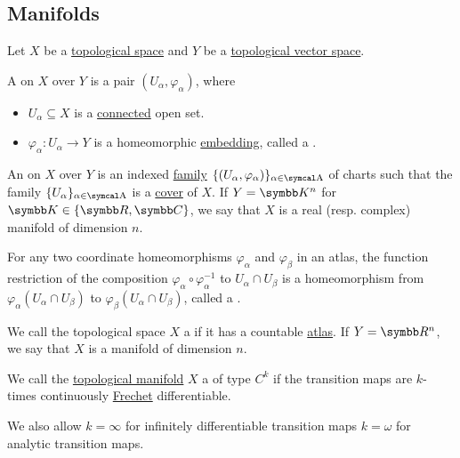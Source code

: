 \subsection{Manifolds}\label{subsec:manifolds}

\begin{definition}\label{def:atlas}\cite[definition 12.1]{Иванов2017}
  Let \( X \) be a \hyperref[def:topological_space]{topological space} and \( Y \) be a \hyperref[def:topological_vector_space]{topological vector space}.

  A  on \( X \) over \( Y \) is a pair \( (U_\alpha, \varphi_\alpha) \), where
  \begin{itemize}
    \item \( U_\alpha \subseteq X \) is a \hyperref[def:connected_space]{connected} open set.
    \item \( \varphi_\alpha: U_\alpha \to Y \) is a homeomorphic \hyperref[def:homeomorphism]{embedding}, called a .
  \end{itemize}

  An  on \( X \) over \( Y \) is an indexed \hyperref[def:indexed_family]{family} \( \{ (U_\alpha, \varphi_\alpha) \}_{\alpha \in \CA} \) of charts such that the family \( \{ U_\alpha \}_{\alpha \in \CA} \) is a \hyperref[def:set_partition]{cover} of \( X \). If \( Y = \BK^n \) for \( \BK \in \{ \BR, \BC \} \), we say that \( X \) is a real (resp. complex) manifold of dimension \( n \).

  For any two coordinate homeomorphisms \( \varphi_\alpha \) and \( \varphi_\beta \) in an atlas, the function restriction of the composition \( \varphi_\alpha \circ \varphi_\alpha^{-1} \) to \( U_\alpha \cap U_\beta \) is a homeomorphism from \( \varphi_\alpha(U_\alpha \cap U_\beta) \) to \( \varphi_\beta(U_\alpha \cap U_\beta) \), called a .
\end{definition}

\begin{definition}\label{def:topological_manifold}\cite[definition 12.4]{Иванов2017}
  We call the topological space \( X \) a  if it has a countable \hyperref[def:atlas]{atlas}. If \( Y = \BR^n \), we say that \( X \) is a manifold of dimension \( n \).
\end{definition}

\begin{definition}\label{def:differentiable_manifold}\cite[definition 12.6]{Иванов2017}
  We call the \hyperref[def:topological_manifold]{topological manifold} \( X \) a  of type \( C^k \) if the transition maps are \( k \)-times continuously \hyperref[def:differentiability/frechet]{Frechet} differentiable.

  We also allow \( k = \infty \) for infinitely differentiable transition maps \( k = \omega \) for analytic transition maps.
\end{definition}
